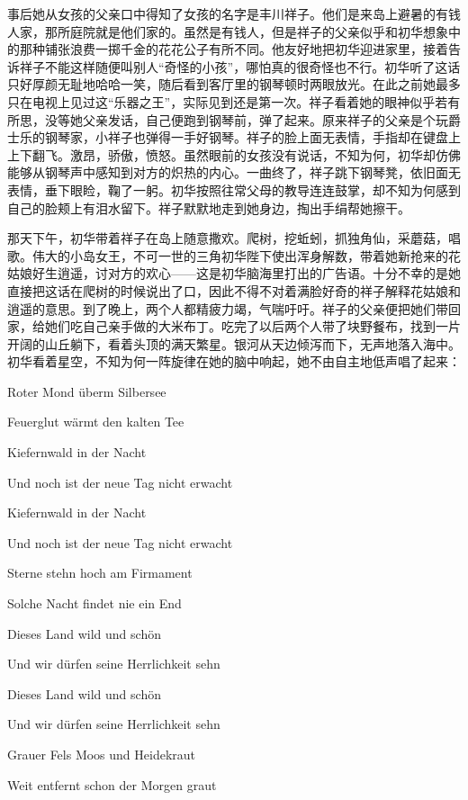 \documentclass{article}
\begin{document}
事后她从女孩的父亲口中得知了女孩的名字是丰川祥子。他们是来岛上避暑的有钱人家，那所庭院就是他们家的。虽然是有钱人，但是祥子的父亲似乎和初华想象中的那种铺张浪费一掷千金的花花公子有所不同。他友好地把初华迎进家里，接着告诉祥子不能这样随便叫别人“奇怪的小孩”，哪怕真的很奇怪也不行。初华听了这话只好厚颜无耻地哈哈一笑，随后看到客厅里的钢琴顿时两眼放光。在此之前她最多只在电视上见过这“乐器之王”，实际见到还是第一次。祥子看着她的眼神似乎若有所思，没等她父亲发话，自己便跑到钢琴前，弹了起来。原来祥子的父亲是个玩爵士乐的钢琴家，小祥子也弹得一手好钢琴。祥子的脸上面无表情，手指却在键盘上上下翻飞。激昂，骄傲，愤怒。虽然眼前的女孩没有说话，不知为何，初华却仿佛能够从钢琴声中感知到对方的炽热的内心。一曲终了，祥子跳下钢琴凳，依旧面无表情，垂下眼睑，鞠了一躬。初华按照往常父母的教导连连鼓掌，却不知为何感到自己的脸颊上有泪水留下。祥子默默地走到她身边，掏出手绢帮她擦干。



那天下午，初华带着祥子在岛上随意撒欢。爬树，挖蚯蚓，抓独角仙，采蘑菇，唱歌。伟大的小岛女王，不可一世的三角初华陛下使出浑身解数，带着她新抢来的花姑娘好生逍遥，讨对方的欢心——这是初华脑海里打出的广告语。十分不幸的是她直接把这话在爬树的时候说出了口，因此不得不对着满脸好奇的祥子解释花姑娘和逍遥的意思。到了晚上，两个人都精疲力竭，气喘吁吁。祥子的父亲便把她们带回家，给她们吃自己亲手做的大米布丁。吃完了以后两个人带了块野餐布，找到一片开阔的山丘躺下，看着头顶的满天繁星。银河从天边倾泻而下，无声地落入海中。初华看着星空，不知为何一阵旋律在她的脑中响起，她不由自主地低声唱了起来：



Roter Mond überm Silbersee

Feuerglut wärmt den kalten Tee 

Kiefernwald in der Nacht

Und noch ist der neue Tag nicht erwacht

Kiefernwald in der Nacht

Und noch ist der neue Tag nicht erwacht 

Sterne stehn hoch am Firmament

Solche Nacht findet nie ein End 

Dieses Land wild und schön

Und wir dürfen seine Herrlichkeit sehn 

Dieses Land wild und schön

Und wir dürfen seine Herrlichkeit sehn 

Grauer Fels Moos und Heidekraut 

Weit entfernt schon der Morgen graut 
\end{document}
